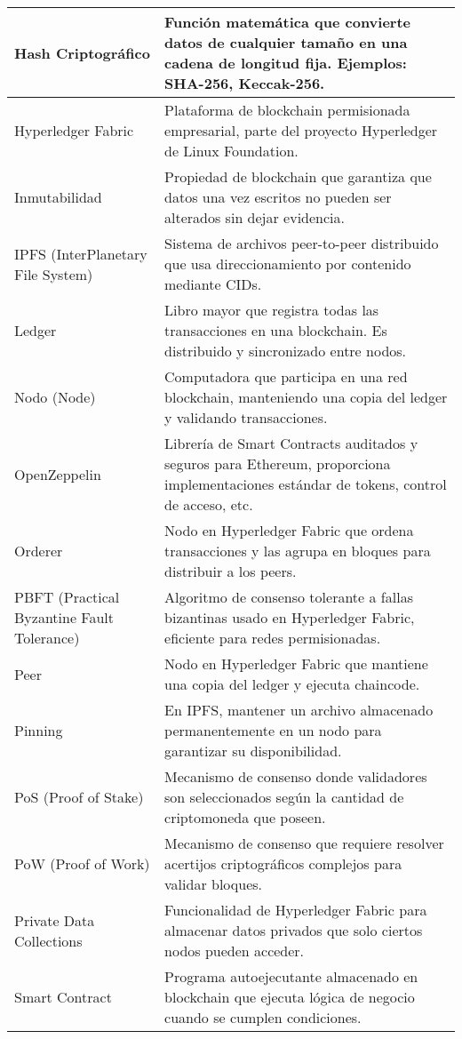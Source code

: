 \begin{longtable}{|p{3.5cm}|p{10.5cm}|}
Hash Criptográfico & Función matemática que convierte datos de cualquier tamaño en una cadena de longitud fija. Ejemplos: SHA-256, Keccak-256. \\ \hline
Hyperledger Fabric & Plataforma de blockchain permisionada empresarial, parte del proyecto Hyperledger de Linux Foundation. \\ \hline
Inmutabilidad & Propiedad de blockchain que garantiza que datos una vez escritos no pueden ser alterados sin dejar evidencia. \\ \hline
IPFS (InterPlanetary File System) & Sistema de archivos peer-to-peer distribuido que usa direccionamiento por contenido mediante CIDs. \\ \hline
Ledger & Libro mayor que registra todas las transacciones en una blockchain. Es distribuido y sincronizado entre nodos. \\ \hline
Nodo (Node) & Computadora que participa en una red blockchain, manteniendo una copia del ledger y validando transacciones. \\ \hline
OpenZeppelin & Librería de Smart Contracts auditados y seguros para Ethereum, proporciona implementaciones estándar de tokens, control de acceso, etc. \\ \hline
Orderer & Nodo en Hyperledger Fabric que ordena transacciones y las agrupa en bloques para distribuir a los peers. \\ \hline
PBFT (Practical Byzantine Fault Tolerance) & Algoritmo de consenso tolerante a fallas bizantinas usado en Hyperledger Fabric, eficiente para redes permisionadas. \\ \hline
Peer & Nodo en Hyperledger Fabric que mantiene una copia del ledger y ejecuta chaincode. \\ \hline
Pinning & En IPFS, mantener un archivo almacenado permanentemente en un nodo para garantizar su disponibilidad. \\ \hline
PoS (Proof of Stake) & Mecanismo de consenso donde validadores son seleccionados según la cantidad de criptomoneda que poseen. \\ \hline
PoW (Proof of Work) & Mecanismo de consenso que requiere resolver acertijos criptográficos complejos para validar bloques. \\ \hline
Private Data Collections & Funcionalidad de Hyperledger Fabric para almacenar datos privados que solo ciertos nodos pueden acceder. \\ \hline
Smart Contract & Programa autoejecutante almacenado en blockchain que ejecuta lógica de negocio cuando se cumplen condiciones. \\ \hline

\end{longtable}
